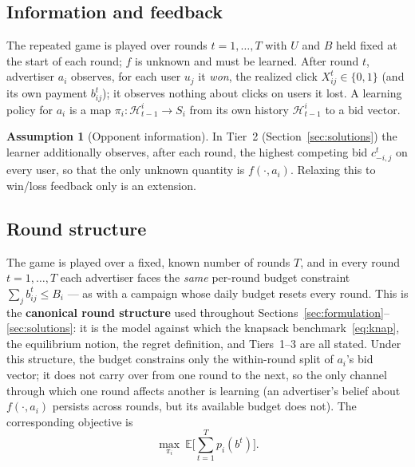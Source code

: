 \documentclass{article}
\theoremstyle{definition}
\newtheorem{assumption}{Assumption}
\theoremstyle{remark}
\newcommand{\E}{\mathbb{E}}
\begin{document}
\subsection{Information and feedback}
The repeated game is played over rounds $t=1,\dots,T$ with $U$ and $B$ held fixed at the start of each round; $f$ is unknown and must be learned. After round $t$, advertiser $a_i$ observes, for each user $u_j$ it \emph{won}, the realized click $X^{t}_{ij}\in\{0,1\}$ (and its own payment $b^t_{ij}$); it observes nothing about clicks on users it lost. A learning policy for $a_i$ is a map $\pi_i:\mathcal H^i_{t-1}\to S_i$ from its own history $\mathcal H^i_{t-1}$ to a bid vector.

\begin{assumption}[Opponent information]\label{ass:opp}
In Tier~2 (Section~\ref{sec:solutions}) the learner additionally observes, after each round, the highest competing bid $c_{-i,j}^t$ on every user, so that the only unknown quantity is $f(\cdot,a_i)$. Relaxing this to win/loss feedback only is an extension.
\end{assumption}

\subsection{Round structure}
\label{sec:roundstructure}
The game is played over a fixed, known number of rounds $T$, and in every round
$t=1,\dots,T$ each advertiser faces the \emph{same} per-round budget constraint
$\sum_j b^t_{ij}\le B_i$ --- as with a campaign whose daily budget resets every
round. This is the \textbf{canonical round structure} used throughout
Sections~\ref{sec:formulation}--\ref{sec:solutions}: it is the model against which
the knapsack benchmark~\eqref{eq:knap}, the equilibrium notion, the regret
definition, and Tiers~1--3 are all stated. Under this structure, the budget
constrains only the within-round split of $a_i$'s bid vector; it does not carry
over from one round to the next, so the only channel through which one round
affects another is learning (an advertiser's belief about $f(\cdot,a_i)$ persists
across rounds, but its available budget does not). The corresponding objective is
\[
\max_{\pi_i}\ \E\Big[\sum_{t=1}^T p_i(b^t)\Big].
\]
\end{document}
